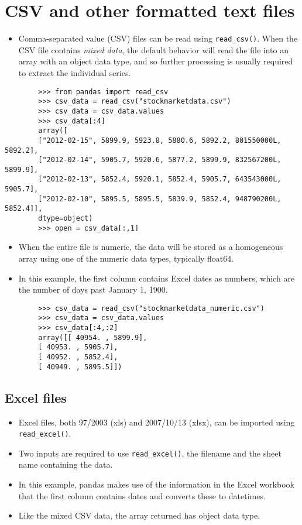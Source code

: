 \documentclass[11pt]{article} %
\begin{document}
	
	\section{CSV and other formatted text files}
	\begin{itemize}
		\item Comma-separated value (CSV) files can be read using \texttt{read\_csv()}. When the CSV file contains \textit{mixed data},
		the default behavior will read the file into an array with an object data type, and so further processing is
		usually required to extract the individual series.
	\end{itemize}
	
	{
		\large
		
		\begin{verbatim}
		>>> from pandas import read_csv
		>>> csv_data = read_csv("stockmarketdata.csv")
		>>> csv_data = csv_data.values
		>>> csv_data[:4]
		array([
		["2012-02-15", 5899.9, 5923.8, 5880.6, 5892.2, 801550000L, 5892.2],
		["2012-02-14", 5905.7, 5920.6, 5877.2, 5899.9, 832567200L, 5899.9],
		["2012-02-13", 5852.4, 5920.1, 5852.4, 5905.7, 643543000L, 5905.7],
		["2012-02-10", 5895.5, 5895.5, 5839.9, 5852.4, 948790200L, 5852.4]], 
		dtype=object)
		>>> open = csv_data[:,1]
		\end{verbatim}
		
	}
	\begin{itemize}
		\item When the entire file is numeric, the data will be stored as a homogeneous array using one of the numeric
		data types, typically float64. 
		\item In this example, the first column contains Excel dates as numbers, which are
		the number of days past January 1, 1900.
	\end{itemize}
	
	\begin{framed}
		\begin{verbatim}
		>>> csv_data = read_csv("stockmarketdata_numeric.csv")
		>>> csv_data = csv_data.values
		>>> csv_data[:4,:2]
		array([[ 40954. , 5899.9],
		[ 40953. , 5905.7],
		[ 40952. , 5852.4],
		[ 40949. , 5895.5]])
		\end{verbatim}
	\end{framed}
	\subsection{Excel files}
	\begin{itemize}
		\item Excel files, both 97/2003 (xls) and 2007/10/13 (xlsx), can be imported using \texttt{read\_excel()}. 
		\item Two inputs are
		required to use \texttt{read\_excel()}, the filename and the sheet name containing the data. 
		\item In this example, pandas
		makes use of the information in the Excel workbook that the first column contains dates and converts
		these to datetimes. 
		\item Like the mixed CSV data, the array returned has object data type.
	\end{itemize}
	
\end{document}
